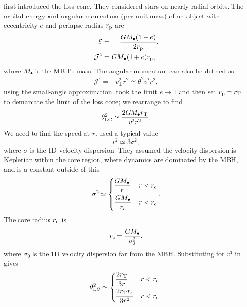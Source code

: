 \citet{Frank1976} first introduced the loss cone. They considered stars on nearly radial orbits. The orbital energy and angular momentum (per unit mass) of an object with eccentricity $e$ and periapse radius $r_\mathrm{p}$ are
\begin{align}
\mathcal{E} = {} & -\dfrac{GM_\bullet(1 - e)}{2r_\mathrm{p}}, \\
\mathcal{J}^2 = {} & GM_\bullet(1 + e)r_\mathrm{p},
\end{align}
where $M_\bullet$ is the MBH's mass. The angular momentum can also be defined as
\begin{align}
\mathcal{J}^2 = {} & v_\perp^2r^2 \simeq \theta^2v^2r^2,
\end{align}
using the small-angle approximation. \citet{Frank1976} took the limit $e \rightarrow 1$ and then set $r_\mathrm{p} = r_\mathrm{T}$ to demarcate the limit of the loss cone; we rearrange to find
\begin{equation}
\theta_\mathrm{LC}^2 \simeq \dfrac{2GM_\bullet r_\mathrm{T}}{v^2r^2}.
\label{eq:LC-FR}
\end{equation}
We need to find the speed at $r$. \citet{Frank1976} used a typical value
\begin{equation}
v^2 \simeq 3\sigma^2,
\end{equation}
where $\sigma$ is the 1D velocity dispersion. They assumed the velocity dispersion is Keplerian within the core region, where dynamics are dominated by the MBH, and is a constant outside of this
\begin{equation}
\sigma^2 \simeq \begin{cases}
\displaystyle \dfrac{GM_\bullet}{r} & r < r\sub{c} \vspace{0.4\normalbaselineskip} \\
\displaystyle \left. \dfrac{GM_\bullet}{r\sub{c}} \right. & r < r\sub{c}
\end{cases}.
\end{equation}
The core radius $r_\mathrm{c}$ is
\begin{equation}
r_\mathrm{c} = \dfrac{GM_\bullet}{\sigma_0^2},
\end{equation}
where $\sigma_0$ is the 1D velocity dispersion far from the MBH. Substituting for $v^2$ in  gives
\begin{align}
\theta\sub{LC}^2 \simeq \begin{cases}
\displaystyle \dfrac{2r\sub{T}}{3r} & r < r\sub{c} \vspace{0.4\normalbaselineskip} \\
\displaystyle \dfrac{2r\sub{T}r\sub{c}}{3r^2} & r < r\sub{c}
\end{cases}.
\label{eq:FR-LC}
\end{align}
